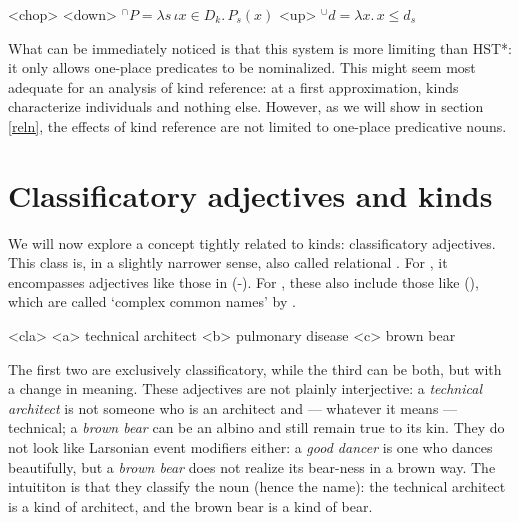 \documentclass[a4paper, 12pt]{article}
\begin{document}
\pex<chop>
\a<down> $^\cap P = \lambda s\,\iota x\in D_k.\,P_s(x)$
\a<up> $^\cup d = \lambda x.\,x\le d_s$
\xe

What can be immediately noticed is that this system is more limiting than HST*: it only allows one-place predicates to be nominalized. This might seem most adequate for an analysis of kind reference: at a first approximation, kinds characterize individuals and nothing else. However, as we will show in section \ref{reln}, the effects of kind reference are not limited to one-place predicative nouns.



\section{Classificatory adjectives and kinds}\label{cladj}

We will now explore a concept tightly related to kinds: classificatory adjectives. This class is, in a slightly narrower sense, also called relational \parencite{mcnally2004relationaladjectivesproperties}. For , it encompasses adjectives like those in (-). For \textcite{rutkowski2005classificationprojectionpolish,rutkowski2006classifyingadjectivesnoun}, these also include those like (), which are called `complex common names' by \textcite{gunkel2009classifyingmodifierscommon}.

\pex<cla>
    \a<a> technical architect
    \a<b> pulmonary disease
    \a<c> brown bear
\xe

The first two are exclusively classificatory, while the third can be both, but with a change in meaning. These adjectives are not plainly interjective: a \textit{technical architect} is not someone who is an architect and --- whatever it means --- technical; a \textit{brown bear} can be an albino and still remain true to its kin. They do not look like Larsonian event modifiers either: a \textit{good dancer} is one who dances beautifully, but a \textit{brown bear} does not realize its bear-ness in a brown way. The intuititon is that they classify the noun (hence the name): the technical architect is a kind of architect, and the brown bear is a kind of bear.
\end{document}
